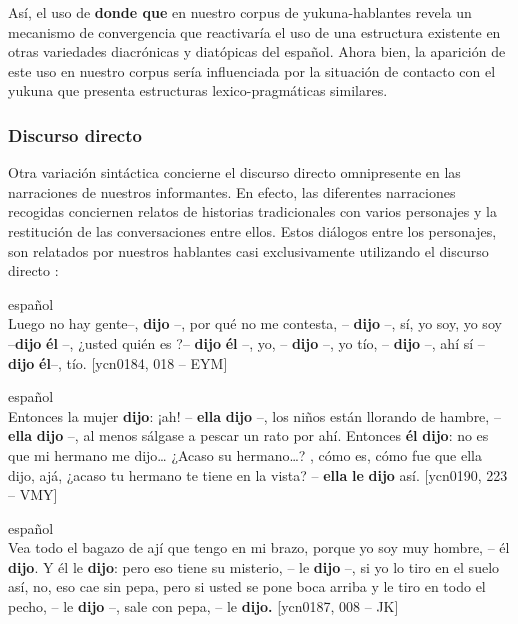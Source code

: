 \documentclass[output=paper]{langscibook}
\begin{document}
Así, el uso de \textbf{donde que} en nuestro corpus de yukuna-hablantes revela un mecanismo de convergencia que reactivaría el uso de una estructura existente en otras variedades diacrónicas y diatópicas del español. Ahora bien, la aparición de este uso en nuestro corpus sería influenciada por la situación de contacto con el yukuna que presenta estructuras lexico-pragmáticas similares. 

\subsubsection{Discurso directo}


Otra variación sintáctica concierne el discurso directo omnipresente en las narraciones de nuestros informantes. En efecto, las diferentes narraciones recogidas conciernen relatos de historias tradicionales con varios personajes y la restitución de las conversaciones entre ellos. Estos diálogos entre los personajes, son relatados por nuestros hablantes casi exclusivamente utilizando el discurso directo :

\ea\label{ex:lemus:36bis}
{español}\\
\label{bkm:Ref484459607}Luego no hay gente–, \textbf{dijo} –, por qué no me contesta, – \textbf{dijo} –, sí, yo soy, yo soy –\textbf{dijo} \textbf{él} –, ¿usted quién es ?– \textbf{dijo} \textbf{él} –, yo, – \textbf{dijo} –, yo tío, – \textbf{dijo} –, ahí sí – \textbf{dijo} \textbf{él}–, tío. {[ycn0184, 018 – EYM}]\\
\z

\ea\label{ex:lemus:37bis}
{español}\\
\label{bkm:Ref484461550}Entonces la mujer \textbf{dijo}: ¡ah! – \textbf{ella} \textbf{dijo}  –, los niños están llorando de hambre, – \textbf{ella} \textbf{dijo} –, al menos sálgase a pescar un rato por ahí. Entonces \textbf{él} \textbf{dijo}: no es que mi hermano me dijo… ¿Acaso su hermano…? , cómo es, cómo fue que ella dijo, ajá, ¿acaso tu hermano te tiene en la vista? – \textbf{ella} \textbf{le} \textbf{dijo} así. {[ycn0190, 223 – VMY}]\\
\z

\ea\label{ex:lemus:38}
{español}\\
\label{bkm:Ref484461552}Vea todo el bagazo de ají que tengo en mi brazo, porque yo soy muy hombre, – él \textbf{dijo}. \label{bkm:Ref484459614}Y él le \textbf{dijo}: pero eso tiene su misterio, – le \textbf{dijo}  –, si yo lo tiro en el suelo así, no, eso cae sin pepa, pero si usted se pone boca arriba y le tiro en todo el pecho, – le \textbf{dijo} –, sale con pepa, – le \textbf{dijo.} {[ycn0187, 008 – JK}] \\
\z
\end{document}

